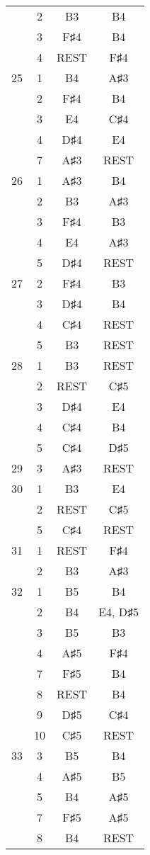\documentclass{article}
\begin{document}
\begin{longtable}{|c|c|c|c|}
  & 2 & B3 & B4 \\ 
  & 3 & F♯4 & B4 \\ 
  & 4 & REST & F♯4 \\ 
\hline
25 & 1 & B4 & A♯3 \\ 
  & 2 & F♯4 & B4 \\ 
  & 3 & E4 & C♯4 \\ 
  & 4 & D♯4 & E4 \\ 
  & 7 & A♯3 & REST \\ 
\hline
26 & 1 & A♯3 & B4 \\ 
  & 2 & B3 & A♯3 \\ 
  & 3 & F♯4 & B3 \\ 
  & 4 & E4 & A♯3 \\ 
  & 5 & D♯4 & REST \\ 
\hline
27 & 2 & F♯4 & B3 \\ 
  & 3 & D♯4 & B4 \\ 
  & 4 & C♯4 & REST \\ 
  & 5 & B3 & REST \\ 
\hline
28 & 1 & B3 & REST \\ 
  & 2 & REST & C♯5 \\ 
  & 3 & D♯4 & E4 \\ 
  & 4 & C♯4 & B4 \\ 
  & 5 & C♯4 & D♯5 \\ 
\hline
29 & 3 & A♯3 & REST \\ 
\hline
30 & 1 & B3 & E4 \\ 
  & 2 & REST & C♯5 \\ 
  & 5 & C♯4 & REST \\ 
\hline
31 & 1 & REST & F♯4 \\ 
  & 2 & B3 & A♯3 \\ 
\hline
32 & 1 & B5 & B4 \\ 
  & 2 & B4 & E4, D♯5 \\ 
  & 3 & B5 & B3 \\ 
  & 4 & A♯5 & F♯4 \\ 
  & 7 & F♯5 & B4 \\ 
  & 8 & REST & B4 \\ 
  & 9 & D♯5 & C♯4 \\ 
  & 10 & C♯5 & REST \\ 
\hline
33 & 3 & B5 & B4 \\ 
  & 4 & A♯5 & B5 \\ 
  & 5 & B4 & A♯5 \\ 
  & 7 & F♯5 & A♯5 \\ 
  & 8 & B4 & REST \\ 

\end{longtable}
\end{document}
